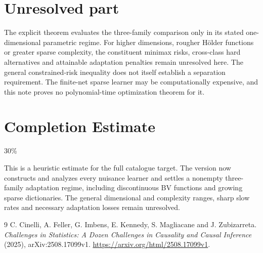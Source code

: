\documentclass[11pt]{article}
\theoremstyle{definition}
\begin{document}
\section*{Unresolved part}
The explicit theorem evaluates the three-family comparison only in its
stated one-dimensional parametric regime. For higher dimensions, rougher
H\"older functions or greater sparse complexity, the constituent minimax
risks, cross-class hard alternatives and attainable adaptation penalties
remain unresolved here. The general constrained-risk inequality does not
itself establish a separation requirement. The finite-net sparse learner
may be computationally expensive, and this note proves no polynomial-time
optimization theorem for it.

\section{Completion Estimate}
30\%

This is a heuristic estimate for the full catalogue target. The version now constructs and analyzes every nuisance learner and settles a nonempty three-family adaptation regime, including discontinuous BV functions and growing sparse dictionaries. The general dimensional and complexity ranges, sharp slow rates and necessary adaptation losses remain unresolved.

\begin{thebibliography}{9}
 C. Cinelli, A. Feller, G. Imbens, E. Kennedy, S. Magliacane and J. Zubizarreta.
\emph{Challenges in Statistics: A Dozen Challenges in Causality and Causal Inference} (2025), arXiv:2508.17099v1.
\url{https://arxiv.org/html/2508.17099v1}.
\end{thebibliography}
\end{document}
